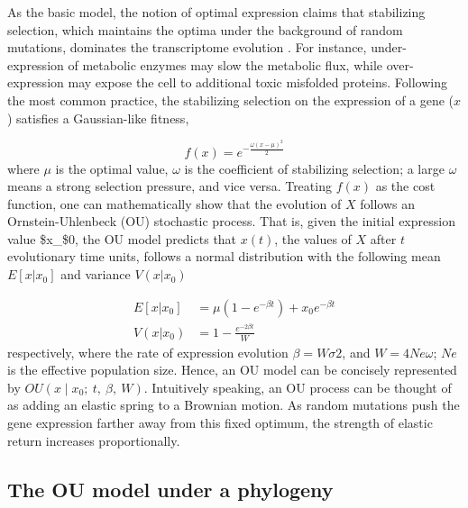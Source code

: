 \documentclass[]{book}
\begin{document}
As the basic model, the notion of optimal expression claims that stabilizing selection, which maintains the optima under the background of random mutations, dominates the transcriptome evolution
\citep{hansen1996}. For instance, under-expression of metabolic enzymes may slow the metabolic flux, while over-expression may expose the cell to additional toxic misfolded proteins. Following the most common practice, the stabilizing selection on the expression of a gene (\(x\)) satisfies a Gaussian-like fitness,

\[f\left(x\right)=e^{-\frac{\omega\left(x-\mu\right)^2}{2}}\tag{4.2}\]
where \(\mu\) is the optimal value, \(\omega\) is the coefficient of stabilizing selection; a large \(\omega\) means a strong selection pressure, and vice versa. Treating \(f\left(x\right)\) as the cost function, one can mathematically show that the evolution of \(X\) follows an Ornstein-Uhlenbeck (OU) stochastic process. That is, given the initial expression value \$x\_\$0, the OU model predicts that \(x\left(t\right)\), the values of \(X\) after \(t\) evolutionary time units, follows a normal distribution with the following mean \(E\left[x|x_0\right]\) and variance \(V\left(x|x_0\right)\)

\[
\begin{split}
E\left[x|x_0\right]&=\mu\left(1-e^{-\beta t}\right)+x_0e^{-\beta t}\\
V\left(x|x_0\right)&=1-\frac{e^{-2\beta t}}{W}
\end{split}\tag{4.3}
\]
respectively, where the rate of expression evolution \(\beta=W\sigma{2}\), and \(W=4Ne\omega\); \(Ne\) is the effective population size\citep[\citet{hansen1996}]{gu2004}. Hence, an OU model can be concisely represented by \(OU\left(x\mid x_0;\  t,\  \beta,\  W\right)\). Intuitively speaking, an OU process can be thought of as adding an elastic spring to a Brownian motion. As random mutations push the gene expression farther away from this fixed optimum, the strength of elastic return increases proportionally.

\hypertarget{the-ou-model-under-a-phylogeny}{%
\subsection{The OU model under a phylogeny}\label{the-ou-model-under-a-phylogeny}}
\end{document}
